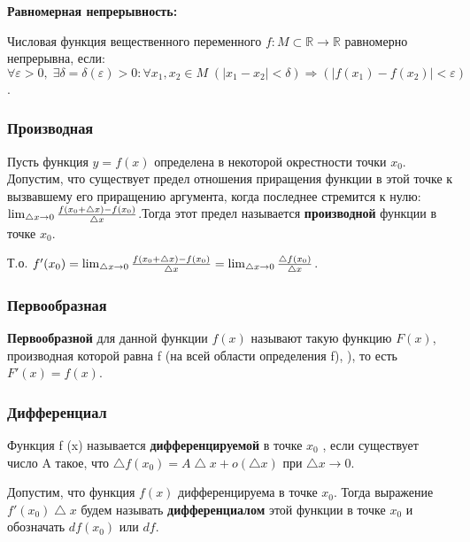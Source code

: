 \documentclass[12pt]{matmex-diploma}
\begin{document}
            \textbf{Равномерная непрерывность:}
            
            Числовая функция вещественного переменного $f \colon M \subset \mathbb R \to \mathbb R$ равномерно непрерывна, если:
            $\forall \varepsilon>0, \; \exists \delta=\delta(\varepsilon)>0 : \forall x_1, x_2 \in M \; (|x_1 - x_2| < \delta) \Rightarrow (|f(x_1) - f(x_2)| < \varepsilon)$.
            
        \subsubsection*{Производная}
        
            Пусть функция $y=f(x)$  определена в некоторой окрестности точки $x_0$. Допустим, что существует предел отношения приращения функции в этой точке к вызвавшему его приращению аргумента, когда последнее стремится к нулю: $\lim_{\bigtriangleup x \to 0}{{f(x_0 + \bigtriangleup x) - f(x_0)} \over \bigtriangleup x}$.Тогда этот предел называется \textbf{производной} функции в точке $x_0$.
            
            Т.о. $f'(x_0) = \lim_{\bigtriangleup x \to 0}{{f(x_0 + \bigtriangleup x) - f(x_0)} \over \bigtriangleup x} = \lim_{\bigtriangleup x \to 0}{{\bigtriangleup f(x_0)} \over \bigtriangleup x}$.
            
        \subsubsection*{Первообразная}
        
            \textbf{Первообразной} для данной функции $f(x)$  называют такую функцию $F(x)$, производная которой равна f (на всей области определения f), ), то есть $F'(x) = f(x)$.
            
        \subsubsection*{Дифференциал}
        
            Функция f (x) называется \textbf{дифференцируемой} в точке $x_0$ , если существует число A такое, что $ \bigtriangleup f(x_0) = A \bigtriangleup x + o(\bigtriangleup x) $ при $\bigtriangleup x \to 0$.
            
            Допустим, что функция $f(x)$ дифференцируема в точке $x_0$. Тогда выражение $f'(x_0)\bigtriangleup x$ будем называть \textbf{дифференциалом} этой функции в точке $x_0$ и обозначать $df(x_0)$ или $df$.
            
\end{document}

